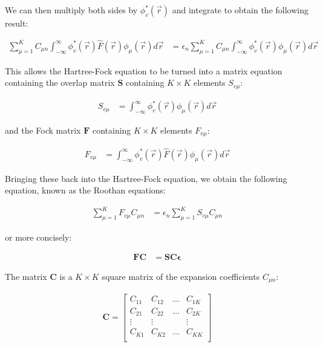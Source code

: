 \documentclass[10pt, oneside, letterpaper]{article}
\begin{document}
We can then multiply both sides by $\phi_v^\ast(\vec{r})$ and integrate to obtain the following result:

\begin{align*}
  \sum_{\mu = 1}^K C_{\mu n} \int_{-\infty}^{\infty} \phi_v^\ast(\vec{r}) \hat{F}(\vec{r}) \phi_\mu(\vec{r})d\vec{r} &= \epsilon_n\sum_{\mu = 1}^K C_{\mu n}\int_{-\infty}^{\infty}\phi_v^\ast(\vec{r})\phi_\mu(\vec{r})d\vec{r}
\end{align*}

This allows the Hartree-Fock equation to be turned into a matrix equation containing the overlap matrix $\bm{S}$ containing $K \times K$ elements $S_{v\mu}$:

\begin{align*}
S_{v\mu} &= \int_{-\infty}^{\infty}\phi_v^\ast(\vec{r})\phi_\mu(\vec{r})d\vec{r}
\end{align*}

and the Fock matrix $\bm{F}$ containing $K \times K$ elements $F_{v\mu}$:

\begin{align*}
F_{v\mu} &= \int_{-\infty}^{\infty} \phi_v^\ast(\vec{r}) \hat{F}(\vec{r}) \phi_\mu(\vec{r})d\vec{r}
\end{align*}

Bringing these back into the Hartree-Fock equation, we obtain the following equation, known as the Roothan equations:

\begin{align*}
\sum_{\mu = 1}^K F_{v\mu} C_{\mu n} &= \epsilon_n\sum_{\mu = 1}^K S_{v\mu} C_{\mu n}
\end{align*}

or more concisely:

\begin{align*}
\bm{F}\bm{C} &= \bm{S}\bm{C}\bm{\epsilon}
\end{align*}

The matrix $\bm{C}$ is a $K \times K$ square matrix of the expansion coefficients $C_{\mu n}$:

\begin{align*}
\bm{C} =
\begin{bmatrix}
 C_{11} & C_{12} & \hdots & C_{1K}\\
 C_{21} & C_{22} & \hdots & C_{2K}\\
 \vdots & \vdots &        & \vdots \\
 C_{K1} & C_{K2} & \hdots & C_{KK}\\
\end{bmatrix}
\end{align*}
\end{document}
